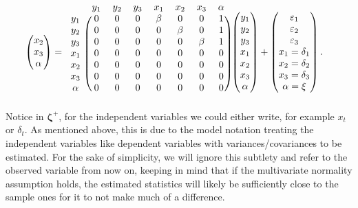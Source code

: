\documentclass[]{interact}
\theoremstyle{plain}%
\theoremstyle{definition}
\theoremstyle{remark}
\begin{document}
\begin{align}
\begin{split}
\begin{pmatrix}
x_{2} \\
x_{3} \\
\alpha
\end{pmatrix} & = 
\begin{blockarray}{cccccccc}
 & y_{1} & y_{2} & y_{3} & x_{1} & x_{2} & x_{3} & \alpha \\
 \begin{block}{c(ccccccc)}
 y_{1}  & 0 & 0 & 0 & \beta & 0 & 0 & 1 \\
 y_{2}  & 0 & 0 & 0 & 0 & \beta & 0 & 1\\
 y_{3}  & 0 & 0 & 0 & 0 & 0 & \beta & 1 \\ 
 x_{1}  & 0 & 0 & 0 & 0 & 0 & 0 & 0 \\
 x_{2}  & 0 & 0 & 0 & 0 & 0 & 0 & 0 \\
 x_{3}  & 0 & 0 & 0 & 0 & 0 & 0 & 0 \\
 \alpha & 0 & 0 & 0 & 0 & 0 & 0 & 0 \\
 \end{block}
\end{blockarray}
\begin{pmatrix}
y_{1} \\
y_{2} \\
y_{3} \\
x_{1} \\
x_{2} \\
x_{3} \\
\alpha
\end{pmatrix} + 
\begin{pmatrix}
\varepsilon_{1} \\
\varepsilon_{2} \\
\varepsilon_{3} \\
x_{1} = \delta_{1} \\
x_{2} = \delta_{2} \\
x_{3} = \delta_{3} \\
\alpha = \xi \\
\end{pmatrix}. 
\end{split} \label{eq:eta}
\end{align} Notice in \(\bm{\zeta}^{+}\), for the independent variables
we could either write, for example \(x_{t}\) or \(\delta_{t}\). As
mentioned above, this is due to the model notation treating the
independent variables like dependent variables with
variances/covariances to be estimated. For the sake of simplicity, we
will ignore this subtlety and refer to the observed variable from now
on, keeping in mind that if the multivariate normality assumption holds,
the estimated statistics will likely be sufficiently close to the sample
ones for it to not make much of a difference.
\end{document}
